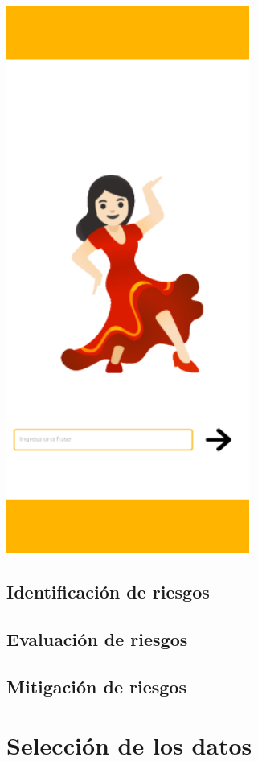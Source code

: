 \begin{center}
    \includegraphics[width=0.6\textwidth]{Images/Cap 3/Pantalla3.png}
\end{center}
\subsection{Identificación de riesgos}
\subsection{Evaluación de riesgos}
\subsection{Mitigación de riesgos}

\section{Selección de los datos}
